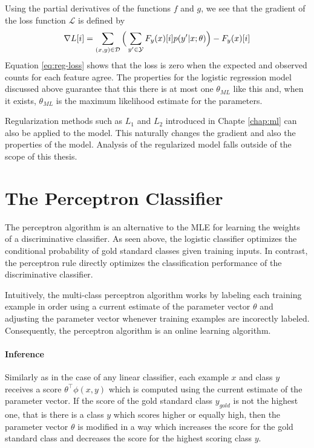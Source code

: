 Using the partial derivatives of the functions $f$ and $g$, we see that the gradient of the loss function $\mathcal{L}$ is defined by
\begin{equation}\nabla L[i] = \sum_{(x,y) \in \mathcal{D}} \Big( \sum_{y' \in \mathcal{Y}}F_y(x)[i] p(y'|x\mbox{$ ; \, $}\theta) \Big) - F_y(x)[i] \label{eq:reg-loss}\end{equation}
Equation \ref{eq:reg-loss} shows that the loss is zero when the
expected and observed counts for each feature agree. The properties
for the logistic regression model discussed above guarantee that this
there is at most one $\theta_{ML}$ like this and, when it exists,
$\theta_{ML}$ is the maximum likelihood estimate for the parameters.

Regularization methods such as $L_1$ and $L_2$ introduced in Chapte
\ref{chap:ml} can also be applied to the model. This naturally changes
the gradient and also the properties of the model. Analysis of the
regularized model falls outside of the scope of this thesis.

\section{The Perceptron Classifier}

The perceptron algorithm \citep{Rosenblatt1958} is an alternative to the MLE
for learning the weights of a discriminative classifier. As seen
above, the logistic classifier optimizes the conditional probability
of gold standard classes given training inputs. In contrast, the
perceptron rule directly optimizes the classification performance of
the discriminative classifier.

Intuitively, the multi-class perceptron algorithm works by labeling
each training example in order using a current estimate of the
parameter vector $\theta$ and adjusting the parameter vector whenever
training examples are incorectly labeled. Consequently, the perceptron
algorithm is an online learning algorithm.

\paragraph{Inference} Similarly as in the case of any linear
classifier, each example $x$ and class $y$ receives a score
$\theta^\top\phi(x,y)$ which is computed using the current estimate of
the parameter vector. If the score of the gold standard class
$y_{gold}$ is not the highest one, that is there is a class $y$ which
scores higher or equally high, then the parameter vector $\theta$ is
modified in a way which increases the score for the gold standard
class and decreases the score for the highest scoring class $y$.

